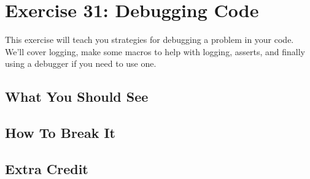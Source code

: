\chapter{Exercise 31: Debugging Code}

This exercise will teach you strategies for debugging a problem in your 
code.  We'll cover logging, make some macros to help with logging, asserts,
and finally using a debugger if you need to use one.


\section{What You Should See}


\section{How To Break It}


\section{Extra Credit}



